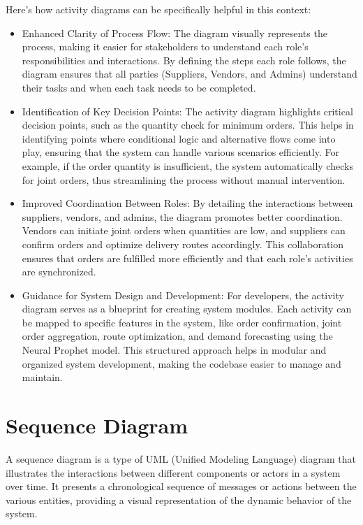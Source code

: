 Here’s how activity diagrams can be specifically helpful in this context:
\begin{itemize}
    \item Enhanced Clarity of Process Flow: The diagram visually represents the process, making it easier for stakeholders to understand each role's responsibilities and interactions. By defining the steps each role follows, the diagram ensures that all parties (Suppliers, Vendors, and Admins) understand their tasks and when each task needs to be completed.
    \item Identification of Key Decision Points: The activity diagram highlights critical decision points, such as the quantity check for minimum orders. This helps in identifying points where conditional logic and alternative flows come into play, ensuring that the system can handle various scenarios efficiently. For example, if the order quantity is insufficient, the system automatically checks for joint orders, thus streamlining the process without manual intervention.
    \item Improved Coordination Between Roles: By detailing the interactions between suppliers, vendors, and admins, the diagram promotes better coordination. Vendors can initiate joint orders when quantities are low, and suppliers can confirm orders and optimize delivery routes accordingly. This collaboration ensures that orders are fulfilled more efficiently and that each role's activities are synchronized.
    \item Guidance for System Design and Development: For developers, the activity diagram serves as a blueprint for creating system modules. Each activity can be mapped to specific features in the system, like order confirmation, joint order aggregation, route optimization, and demand forecasting using the Neural Prophet model. This structured approach helps in modular and organized system development, making the codebase easier to manage and maintain.
\end{itemize}
\section{Sequence Diagram}

A sequence diagram is a type of UML (Unified Modeling Language) diagram that illustrates the interactions between different components or actors in a system over time. It presents a chronological sequence of messages or actions between the various entities, providing a visual representation of the dynamic behavior of the system.

